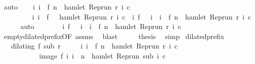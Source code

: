 \begin{isabellebody}
\ auto\isanewline
\ \ \isamarkupfalse%
\ {\isacartoucheopen}{\isacharbraceleft}i{\isachardot}\ i\ {\isasymle}\ f\ n\ {\isasymand}\ hamlet\ {\isacharparenleft}{\isacharparenleft}Rep{\isacharunderscore}run\ r{\isacharparenright}\ i\ c{\isacharparenright}{\isacharbraceright}\isanewline
\ \ \ \ \ \ \ \ {\isacharequal}\ {\isacharbraceleft}i{\isachardot}\ i\ {\isacharless}\ f\ {}\ {\isasymand}\ hamlet\ {\isacharparenleft}{\isacharparenleft}Rep{\isacharunderscore}run\ r{\isacharparenright}\ i\ c{\isacharparenright}{\isacharbraceright}\ {\isasymunion}\ {\isacharbraceleft}i{\isachardot}\ f\ {}\ {\isasymle}\ i\ {\isasymand}\ i\ {\isasymle}\ f\ n\ {\isasymand}\ hamlet\ {\isacharparenleft}{\isacharparenleft}Rep{\isacharunderscore}run\ r{\isacharparenright}\ i\ c{\isacharparenright}{\isacharbraceright}{\isacartoucheclose}\isanewline
\ \ \ \ \isamarkupfalse%
\ auto\isanewline
\ \ \isamarkupfalse%
\ \isamarkupfalse%
\ {\isacartoucheopen}{\isachardot}{\isachardot}{\isachardot}\ {\isacharequal}\ {\isacharbraceleft}i{\isachardot}\ f\ {}\ {\isasymle}\ i\ {\isasymand}\ i\ {\isasymle}\ f\ n\ {\isasymand}\ hamlet\ {\isacharparenleft}{\isacharparenleft}Rep{\isacharunderscore}run\ r{\isacharparenright}\ i\ c{\isacharparenright}{\isacharbraceright}{\isacartoucheclose}\isanewline
\ \ \ \ \ \isamarkupfalse%
\ empty{\isacharunderscore}dilated{\isacharunderscore}prefix{\isacharbrackleft}OF\ assms{\isacharbrackright}\ \isamarkupfalse%
\ blast\isanewline
\ \ \isamarkupfalse%
\ \isamarkupfalse%
\ {\isacharquery}thesis\ \isamarkupfalse%
\ simp\isanewline
{}\isamarkupfalse%
%
\endisatagproof
{\isafoldproof}%
%
\isadelimproof
\isanewline
%
\endisadelimproof
\isanewline
{}\isamarkupfalse%
\ dilated{\isacharunderscore}prefix{\isacharcolon}\isanewline
\ \ \ {\isacartoucheopen}dilating\ f\ sub\ r{\isacartoucheclose}\isanewline
\ \ \ \ \ {\isacartoucheopen}{\isacharbraceleft}i{\isachardot}\ i\ {\isasymle}\ f\ n\ {\isasymand}\ hamlet\ {\isacharparenleft}{\isacharparenleft}Rep{\isacharunderscore}run\ r{\isacharparenright}\ i\ c{\isacharparenright}{\isacharbraceright}\isanewline
\ \ \ \ \ \ \ \ \ \ {\isacharequal}\ image\ f\ {\isacharbraceleft}i{\isachardot}\ i\ {\isasymle}\ n\ {\isasymand}\ hamlet\ {\isacharparenleft}{\isacharparenleft}Rep{\isacharunderscore}run\ sub{\isacharparenright}\ i\ c{\isacharparenright}{\isacharbraceright}{\isacartoucheclose}\isanewline

\end{isabellebody}
